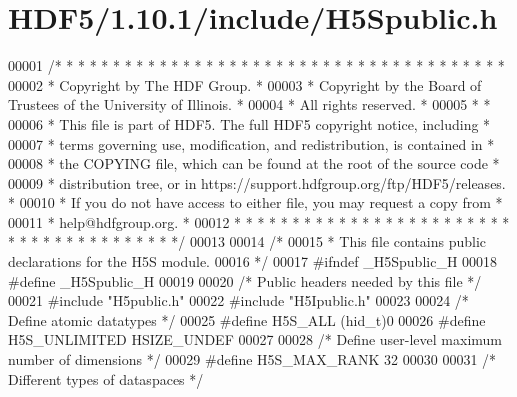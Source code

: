 \hypertarget{_h_d_f5_21_810_81_2include_2_h5_spublic_8h_source}{}\section{H\+D\+F5/1.10.1/include/\+H5\+Spublic.h}
\label{_h_d_f5_21_810_81_2include_2_h5_spublic_8h_source}

\begin{DoxyCode}
00001 \textcolor{comment}{/* * * * * * * * * * * * * * * * * * * * * * * * * * * * * * * * * * * * * * *}
00002 \textcolor{comment}{ * Copyright by The HDF Group.                                               *}
00003 \textcolor{comment}{ * Copyright by the Board of Trustees of the University of Illinois.         *}
00004 \textcolor{comment}{ * All rights reserved.                                                      *}
00005 \textcolor{comment}{ *                                                                           *}
00006 \textcolor{comment}{ * This file is part of HDF5.  The full HDF5 copyright notice, including     *}
00007 \textcolor{comment}{ * terms governing use, modification, and redistribution, is contained in    *}
00008 \textcolor{comment}{ * the COPYING file, which can be found at the root of the source code       *}
00009 \textcolor{comment}{ * distribution tree, or in https://support.hdfgroup.org/ftp/HDF5/releases.  *}
00010 \textcolor{comment}{ * If you do not have access to either file, you may request a copy from     *}
00011 \textcolor{comment}{ * help@hdfgroup.org.                                                        *}
00012 \textcolor{comment}{ * * * * * * * * * * * * * * * * * * * * * * * * * * * * * * * * * * * * * * */}
00013 
00014 \textcolor{comment}{/*}
00015 \textcolor{comment}{ * This file contains public declarations for the H5S module.}
00016 \textcolor{comment}{ */}
00017 \textcolor{preprocessor}{#ifndef \_H5Spublic\_H}
00018 \textcolor{preprocessor}{#define \_H5Spublic\_H}
00019 
00020 \textcolor{comment}{/* Public headers needed by this file */}
00021 \textcolor{preprocessor}{#include "H5public.h"}
00022 \textcolor{preprocessor}{#include "H5Ipublic.h"}
00023 
00024 \textcolor{comment}{/* Define atomic datatypes */}
00025 \textcolor{preprocessor}{#define H5S\_ALL         (hid\_t)0}
00026 \textcolor{preprocessor}{#define H5S\_UNLIMITED   HSIZE\_UNDEF}
00027 
00028 \textcolor{comment}{/* Define user-level maximum number of dimensions */}
00029 \textcolor{preprocessor}{#define H5S\_MAX\_RANK    32}
00030 
00031 \textcolor{comment}{/* Different types of dataspaces */}

\end{DoxyCode}

